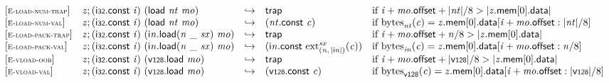 $$
\begin{array}{@{}l@{}lcl@{}l@{}}
{[\textsc{\scriptsize E{-}load{-}num{-}trap}]} \quad & {\mathit{z}} ; (\mathsf{i{\scriptstyle32}}.\mathsf{const}~{\mathit{i}})~(\mathsf{load}~{\mathit{nt}}~{\mathit{mo}}) &\hookrightarrow& \mathsf{trap} &\quad
  \mbox{if}~{\mathit{i}} + {\mathit{mo}}.\mathsf{offset} + {|{\mathit{nt}}|} / 8 > {|{{\mathit{z}}.\mathsf{mem}}{{}[0]}.\mathsf{data}|} \\
{[\textsc{\scriptsize E{-}load{-}num{-}val}]} \quad & {\mathit{z}} ; (\mathsf{i{\scriptstyle32}}.\mathsf{const}~{\mathit{i}})~(\mathsf{load}~{\mathit{nt}}~{\mathit{mo}}) &\hookrightarrow& ({\mathit{nt}}.\mathsf{const}~{\mathit{c}}) &\quad
  \mbox{if}~{{\mathrm{bytes}}}_{{\mathit{nt}}}({\mathit{c}}) = {{\mathit{z}}.\mathsf{mem}}{{}[0]}.\mathsf{data}{}[{\mathit{i}} + {\mathit{mo}}.\mathsf{offset} : {|{\mathit{nt}}|} / 8] \\
{[\textsc{\scriptsize E{-}load{-}pack{-}trap}]} \quad & {\mathit{z}} ; (\mathsf{i{\scriptstyle32}}.\mathsf{const}~{\mathit{i}})~({{\mathsf{i}}{{\mathit{n}}}.\mathsf{load}}{({\mathit{n}}~\mathsf{\_}~{\mathit{sx}})}~{\mathit{mo}}) &\hookrightarrow& \mathsf{trap} &\quad
  \mbox{if}~{\mathit{i}} + {\mathit{mo}}.\mathsf{offset} + {\mathit{n}} / 8 > {|{{\mathit{z}}.\mathsf{mem}}{{}[0]}.\mathsf{data}|} \\
{[\textsc{\scriptsize E{-}load{-}pack{-}val}]} \quad & {\mathit{z}} ; (\mathsf{i{\scriptstyle32}}.\mathsf{const}~{\mathit{i}})~({{\mathsf{i}}{{\mathit{n}}}.\mathsf{load}}{({\mathit{n}}~\mathsf{\_}~{\mathit{sx}})}~{\mathit{mo}}) &\hookrightarrow& ({\mathsf{i}}{{\mathit{n}}}.\mathsf{const}~{{{{\mathrm{ext}}}_{({\mathit{n}},\, {|{\mathsf{i}}{{\mathit{n}}}|})}^{{\mathit{sx}}}}}{({\mathit{c}})}) &\quad
  \mbox{if}~{{\mathrm{bytes}}}_{{{\mathit{i}}}{{\mathit{n}}}}({\mathit{c}}) = {{\mathit{z}}.\mathsf{mem}}{{}[0]}.\mathsf{data}{}[{\mathit{i}} + {\mathit{mo}}.\mathsf{offset} : {\mathit{n}} / 8] \\
{[\textsc{\scriptsize E{-}vload{-}oob}]} \quad & {\mathit{z}} ; (\mathsf{i{\scriptstyle32}}.\mathsf{const}~{\mathit{i}})~(\mathsf{v{\scriptstyle128}.load}~{\mathit{mo}}) &\hookrightarrow& \mathsf{trap} &\quad
  \mbox{if}~{\mathit{i}} + {\mathit{mo}}.\mathsf{offset} + {|\mathsf{v{\scriptstyle128}}|} / 8 > {|{{\mathit{z}}.\mathsf{mem}}{{}[0]}.\mathsf{data}|} \\
{[\textsc{\scriptsize E{-}vload{-}val}]} \quad & {\mathit{z}} ; (\mathsf{i{\scriptstyle32}}.\mathsf{const}~{\mathit{i}})~(\mathsf{v{\scriptstyle128}.load}~{\mathit{mo}}) &\hookrightarrow& (\mathsf{v{\scriptstyle128}}.\mathsf{const}~{\mathit{c}}) &\quad
  \mbox{if}~{{\mathrm{bytes}}}_{\mathsf{v{\scriptstyle128}}}({\mathit{c}}) = {{\mathit{z}}.\mathsf{mem}}{{}[0]}.\mathsf{data}{}[{\mathit{i}} + {\mathit{mo}}.\mathsf{offset} : {|\mathsf{v{\scriptstyle128}}|} / 8] \\
\end{array}
$$


